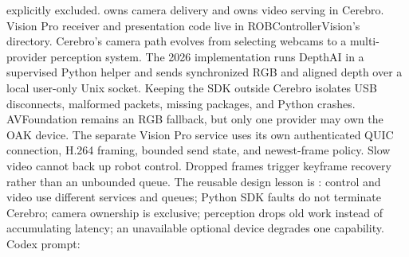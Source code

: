 {}explicitly excluded.\markdownRendererInterblockSeparator
{}\markdownRendererThematicBreak{}\markdownRendererInterblockSeparator
{}
\markdownRendererSectionEnd \markdownRendererSectionBegin
{}\markdownRendererInterblockSeparator
{}\markdownRendererBlockQuoteBegin
{}  owns camera delivery and  owns video serving in Cerebro. Vision Pro receiver and presentation code live in ROBControllerVision's  directory.\markdownRendererBlockQuoteEnd \markdownRendererInterblockSeparator
{}Cerebro's camera path evolves from selecting webcams to a multi-provider\markdownRendererSoftLineBreak
{}perception system.\markdownRendererParagraphSeparator
{}The 2026 implementation runs DepthAI in a supervised Python helper and sends\markdownRendererSoftLineBreak
{}synchronized RGB and aligned depth over a local user-only Unix socket. Keeping\markdownRendererSoftLineBreak
{}the SDK outside Cerebro isolates USB disconnects, malformed packets, missing\markdownRendererSoftLineBreak
{}packages, and Python crashes. AVFoundation remains an RGB fallback, but only\markdownRendererSoftLineBreak
{}one provider may own the OAK device.\markdownRendererParagraphSeparator
{}The separate Vision Pro service uses its own authenticated QUIC connection,\markdownRendererSoftLineBreak
{}H.264 framing, bounded send state, and newest-frame policy. Slow video cannot\markdownRendererSoftLineBreak
{}back up robot control. Dropped frames trigger keyframe recovery rather than an\markdownRendererSoftLineBreak
{}unbounded queue.\markdownRendererParagraphSeparator
{}The reusable design lesson is :\markdownRendererInterblockSeparator
{}\markdownRendererUlBegin
\markdownRendererUlItem control and video use different services and queues;\markdownRendererUlItemEnd 
\markdownRendererUlItem Python SDK faults do not terminate Cerebro;\markdownRendererUlItemEnd 
\markdownRendererUlItem camera ownership is exclusive;\markdownRendererUlItemEnd 
\markdownRendererUlItem perception drops old work instead of accumulating latency;\markdownRendererUlItemEnd 
\markdownRendererUlItem an unavailable optional device degrades one capability.\markdownRendererUlItemEnd 
\markdownRendererUlEnd \markdownRendererInterblockSeparator
{}Codex prompt:\markdownRendererInterblockSeparator
{}\markdownRendererInterblockSeparator

